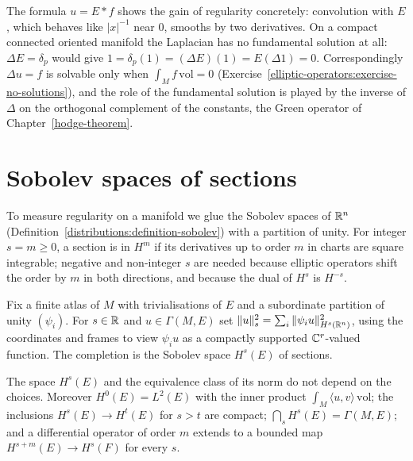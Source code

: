 The formula $u = E * f$ shows the gain of regularity concretely: convolution with $E$, which behaves like $|x|^{-1}$ near $0$, smooths by two derivatives. On a compact connected oriented manifold the
Laplacian has no fundamental solution at all: $\Delta E = \delta_p$ would give $1 = \delta_p(1) = (\Delta E)(1) = E(\Delta1) = 0$. Correspondingly $\Delta u = f$ is solvable only when $\int_Mf\,\mathrm{vol} = 0$
(Exercise~\ref{elliptic-operators:exercise-no-solutions}), and the role of the fundamental solution is played by the inverse of $\Delta$ on the orthogonal complement of the constants, the Green
operator of Chapter~\ref{hodge-theorem}.

\section{Sobolev spaces of sections}\label{elliptic-operators:section-sobolev-sections}

To measure regularity on a manifold we glue the Sobolev spaces of $\mathbb{R}^n$ (Definition~\ref{distributions:definition-sobolev}) with a partition of unity. For integer $s = m \geq 0$, a section is in $H^m$
if its derivatives up to order $m$ in charts are square integrable; negative and non-integer $s$ are needed because elliptic operators shift the order by $m$ in both directions, and because the
dual of $H^s$ is $H^{-s}$.

\begin{definition}\label{elliptic-operators:definition-sobolev-sections}
Fix a finite atlas of $M$ with trivialisations of $E$ and a subordinate partition of unity $(\psi_i)$. For $s \in \mathbb{R}$ and $u \in \Gamma(M, E)$ set
$\|u\|_s^2 = \sum_i\|\psi_iu\|_{H^s(\mathbb{R}^n)}^2$, using the coordinates and frames to view $\psi_iu$ as a compactly supported $\mathbb{C}^r$-valued function. The completion is the Sobolev space $H^s(E)$ of sections.
\end{definition}

\begin{proposition}\label{elliptic-operators:proposition-sobolev-sections}
The space $H^s(E)$ and the equivalence class of its norm do not depend on the choices. Moreover $H^0(E) = L^2(E)$ with the inner product $\int_M\langle u, v\rangle\,\mathrm{vol}$; the inclusions
$H^s(E) \to H^t(E)$ for $s > t$ are compact; $\bigcap_sH^s(E) = \Gamma(M, E)$; and a differential operator of order $m$ extends to a bounded map $H^{s+m}(E) \to H^s(F)$ for every $s$.
\end{proposition}

